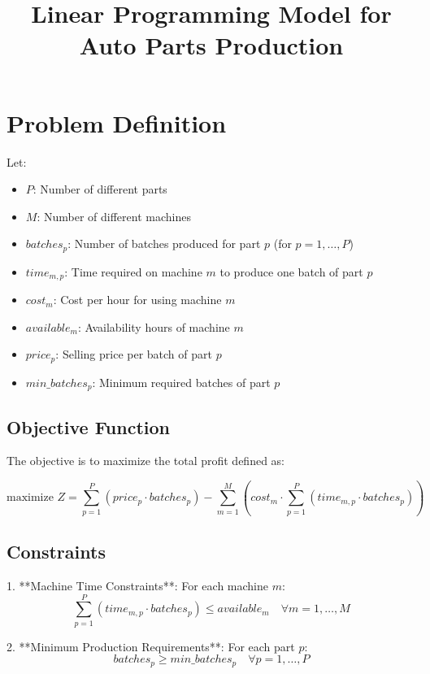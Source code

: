 \documentclass{article}
\begin{document}
\title{Linear Programming Model for Auto Parts Production}
\author{}
\date{}
\maketitle

\section*{Problem Definition}

Let:
\begin{itemize}
    \item \( P \): Number of different parts
    \item \( M \): Number of different machines
    \item \( batches_{p} \): Number of batches produced for part \( p \) (for \( p = 1, \ldots, P \))
    \item \( time_{m,p} \): Time required on machine \( m \) to produce one batch of part \( p \)
    \item \( cost_{m} \): Cost per hour for using machine \( m \)
    \item \( available_{m} \): Availability hours of machine \( m \)
    \item \( price_{p} \): Selling price per batch of part \( p \)
    \item \( min\_batches_{p} \): Minimum required batches of part \( p \)
\end{itemize}

\subsection*{Objective Function}

The objective is to maximize the total profit defined as:

\[
\text{maximize } Z = \sum_{p=1}^{P} (price_{p} \cdot batches_{p}) - \sum_{m=1}^{M} \left( cost_{m} \cdot \sum_{p=1}^{P} (time_{m,p} \cdot batches_{p}) \right)
\]

\subsection*{Constraints}

1. **Machine Time Constraints**:
   For each machine \( m \):
   \[
   \sum_{p=1}^{P} (time_{m,p} \cdot batches_{p}) \leq available_{m} \quad \forall m = 1, \ldots, M
   \]
   
2. **Minimum Production Requirements**:
   For each part \( p \):
   \[
   batches_{p} \geq min\_batches_{p} \quad \forall p = 1, \ldots, P
   \]
\end{document}
